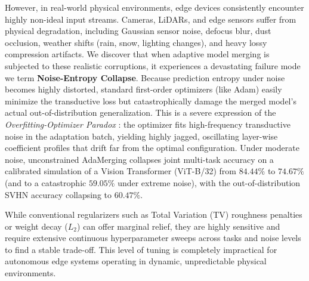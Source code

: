 However, in real-world physical environments, edge devices consistently encounter highly non-ideal input streams. 
Cameras, LiDARs, and edge sensors suffer from physical degradation, including Gaussian sensor noise, defocus blur, dust occlusion, weather shifts (rain, snow, lighting changes), and heavy lossy compression artifacts. 
We discover that when adaptive model merging is subjected to these realistic corruptions, it experiences a devastating failure mode we term \textbf{Noise-Entropy Collapse}. 
Because prediction entropy under noise becomes highly distorted, standard first-order optimizers (like Adam) easily minimize the transductive loss but catastrophically damage the merged model's actual out-of-distribution generalization. 
This is a severe expression of the \emph{Overfitting-Optimizer Paradox} \cite{yang2024adamerging}: the optimizer fits high-frequency transductive noise in the adaptation batch, yielding highly jagged, oscillating layer-wise coefficient profiles that drift far from the optimal configuration. 
Under moderate noise, unconstrained AdaMerging collapses joint multi-task accuracy on a calibrated simulation of a Vision Transformer (ViT-B/32) from $84.44\%$ to $74.67\%$ (and to a catastrophic $59.05\%$ under extreme noise), with the out-of-distribution SVHN accuracy collapsing to $60.47\%$.

While conventional regularizers such as Total Variation (TV) roughness penalties or weight decay ($L_2$) can offer marginal relief, they are highly sensitive and require extensive continuous hyperparameter sweeps across tasks and noise levels to find a stable trade-off. 
This level of tuning is completely impractical for autonomous edge systems operating in dynamic, unpredictable physical environments.

